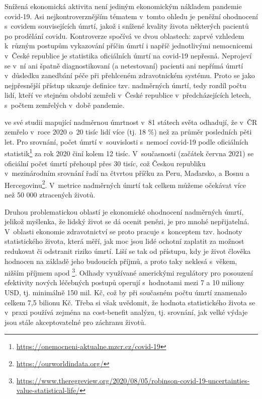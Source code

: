 Snížená ekonomická aktivita není jediným ekonomickým nákladem pandemie covid-19. Asi nejkontroverznějším tématem v~tomto ohledu je peněžní ohodnocení s~covidem souvisejících úmrtí, jakož i snížené kvality života některých pacientů po prodělání covidu. Kontroverze spočívá ve dvou oblastech: zaprvé vzhledem k~různým postupům vykazování příčin úmrtí i napříč jednotlivými nemocnicemi v~České republice je statistika oficiálních úmrtí na covid-19 nepřesná. Neprojeví se v~ní ani špatně diagnostikovaní (a netestovaní) pacienti ani nepřímá úmrtí v~důsledku zanedbání péče při přehlceném zdravotnickém systému. Proto se jako nejpřesnější přístup ukazuje definice tzv. nadměrných úmrtí, tedy rozdíl počtu lidí, kteří ve stejném období zemřeli v~České republice v~předcházejících letech, s~počtem zemřelých v~době pandemie. 

\cite{karlinsky2021tracking} ve své studii mapující nadměrnou úmrtnost v~81 státech světa odhadují, že v~ČR zemřelo v~roce 2020 o~20 tisíc lidí více (tj. 18 \%) než za průměr posledních pěti let. Pro srovnání, počet úmrtí v~souvislosti s~nemocí covid-19 podle oficiálních statistik\footnote{\url{https://onemocneni-aktualne.mzcr.cz/covid-19}} za rok 2020 činí kolem 12 tisíc. V~současnosti (začátek června 2021) se oficiální počet úmrtí přehoupl přes 30 tisíc, což Českou republiku v~mezinárodním srovnání řadí na čtvrtou příčku za Peru, Maďarsko, a Bosnu a Hercegovinu\footnote{\url{https://ourworldindata.org/}}. V~metrice nadměrných úmrtí tak celkem můžeme očekávat více než 50 000 ztracených životů.

Druhou problematickou oblastí je ekonomické ohodnocení nadměrných úmrtí, jelikož myšlenka, že lidský život se dá ocenit penězi, je pro mnohé nepřijatelná. V~oblasti ekonomie zdravotnictví se proto pracuje s~konceptem tzv. hodnoty statistického života, která měří, jak moc jsou lidé ochotní zaplatit za možnost redukovat či odstranit riziko úmrtí. Liší se tak od přístupu, kdy je život člověka hodnocen na základě jeho budoucích příjmů, a proto taky neklesá s~věkem, nižším příjmem apod \footnote{\url{https://www.theregreview.org/2020/08/05/robinson-covid-19-uncertainties-value-statistical-life/}}. Odhady využívané americkými regulátory pro posouzení efektivity nových léčebných postupů operují s~hodnotami mezi 7 a 10 miliony USD, tj. minimálně 150 mil. Kč, což by při současném počtu úmrtí znamenalo celkem 7,5 bilionu Kč. Třeba si však uvědomit, že hodnota statistického života se v~praxi používá zejména na cost-benefit analýzu, tj. srovnání, jak velké výdaje jsou stále akceptovatelné pro záchranu životů.

